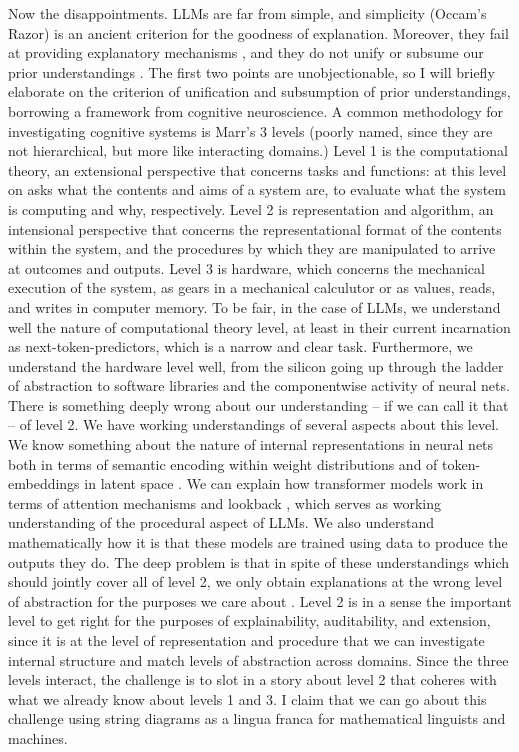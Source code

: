 Now the disappointments. LLMs are far from simple, and simplicity (Occam's Razor) is an ancient criterion for the goodness of explanation. Moreover, they fail at providing explanatory mechanisms \citep{}, and they do not unify or subsume our prior understandings \citep{}. The first two points are unobjectionable, so I will briefly elaborate on the criterion of unification and subsumption of prior understandings, borrowing a framework from cognitive neuroscience. A common methodology for investigating cognitive systems is Marr's 3 levels \citep{} (poorly named, since they are not hierarchical, but more like interacting domains.) Level 1 is the computational theory, an extensional perspective that concerns tasks and functions: at this level on asks what the contents and aims of a system are, to evaluate what the system is computing and why, respectively. Level 2 is representation and algorithm, an intensional perspective that concerns the representational format of the contents within the system, and the procedures by which they are manipulated to arrive at outcomes and outputs. Level 3 is hardware, which concerns the mechanical execution of the system, as gears in a mechanical calculutor or as values, reads, and writes in computer memory. To be fair, in the case of LLMs, we understand well the nature of computational theory level, at least in their current incarnation as next-token-predictors, which is a narrow and clear task. Furthermore, we understand the hardware level well, from the silicon going up through the ladder of abstraction to software libraries and the componentwise activity of neural nets. There is something deeply wrong about our understanding -- if we can call it that -- of level 2. We have working understandings of several aspects about this level. We know something about the nature of internal representations in neural nets both in terms of semantic encoding within weight distributions \citep{} and of token-embeddings in latent space \citep{}. We can explain how transformer models work in terms of attention mechanisms and lookback \citep{}, which serves as working understanding of the procedural aspect of LLMs. We also understand mathematically how it is that these models are trained using data to produce the outputs they do. The deep problem is that in spite of these understandings which should jointly cover all of level 2, we only obtain explanations at the wrong level of abstraction for the purposes we care about \citep{}. Level 2 is in a sense the important level to get right for the purposes of explainability, auditability, and extension, since it is at the level of representation and procedure that we can investigate internal structure and match levels of abstraction across domains. Since the three levels interact, the challenge is to slot in a story about level 2 that coheres with what we already know about levels 1 and 3. I claim that we can go about this challenge using string diagrams as a lingua franca for mathematical linguists and machines.

